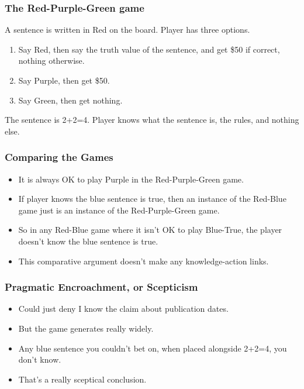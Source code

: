 \begin{frame}

\frametitle{The Red-Purple-Green game}
\label{thered-purple-greengame}

A sentence is written in Red on the board. Player has three options.

\begin{enumerate}
\item Say Red, then say the truth value of the sentence, and get \$50 if correct, nothing otherwise.

\item Say Purple, then get \$50.

\item Say Green, then get nothing.

\end{enumerate}
The sentence is 2+2=4. Player knows what the sentence is, the rules, and nothing else. 

\end{frame}

\begin{frame}

\frametitle{Comparing the Games}
\label{comparingthegames}

\begin{itemize}
\item It is always OK to play Purple in the Red-Purple-Green game.

\item If player knows the blue sentence is true, then an instance of the Red-Blue game just is an instance of the Red-Purple-Green game.

\item So in any Red-Blue game where it isn't OK to play Blue-True, the player doesn't know the blue sentence is true.\pause

\item This comparative argument doesn't make any knowledge-action links.

\end{itemize}
\end{frame}

\begin{frame}

\frametitle{Pragmatic Encroachment, or Scepticism}
\label{pragmaticencroachmentorscepticism}

\begin{itemize}
\item Could just deny I know the claim about publication dates.

\item But the game generates really widely.

\item Any blue sentence you couldn't bet on, when placed alongside 2+2=4, you don't know.

\item That's a really sceptical conclusion.

\end{itemize}
\end{frame}

